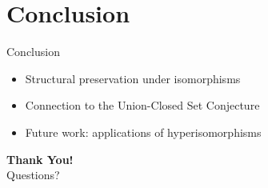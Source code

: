 \documentclass{beamer}
\begin{document}
\section{Conclusion}
\begin{frame}{Conclusion}
    \begin{itemize}
        \item Structural preservation under isomorphisms
        \item Connection to the Union-Closed Set Conjecture
        \item Future work: applications of hyperisomorphisms
    \end{itemize}
\end{frame}

\begin{frame}
    \centering
    {\Huge \textbf{Thank You!}}
    \\ Questions?
\end{frame}
\end{document}
